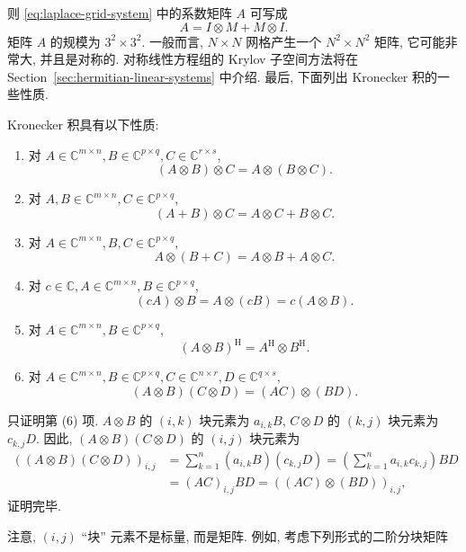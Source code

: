 {则 \eqref{eq:laplace-grid-system} 中的系数矩阵 $A$ 可写成}
\begin{equation}\label{eq:laplace-kronecker-sum}
A=I\otimes M+M\otimes I.
\end{equation}
{矩阵 $A$ 的规模为 $3^2\times3^2$. 一般而言, $N\times N$ 网格产生一个 $N^2\times N^2$ 矩阵, 它可能非常大, 并且是对称的. 对称线性方程组的 Krylov 子空间方法将在 Section\ \ref{sec:hermitian-linear-systems} 中介绍. 最后, 下面列出 Kronecker 积的一些性质.}
\begin{Theorem}\label{thm:kronecker-product-properties}
{Kronecker 积具有以下性质:}
\begin{enumerate}
\item {对 $A\in\mathbb{C}^{m\times n},B\in\mathbb{C}^{p\times q},C\in\mathbb{C}^{r\times s}$,}
\[(A\otimes B)\otimes C=A\otimes(B\otimes C).\]
\item {对 $A,B\in\mathbb{C}^{m\times n},C\in\mathbb{C}^{p\times q}$,}
\[(A+B)\otimes C=A\otimes C+B\otimes C.\]
\item {对 $A\in\mathbb{C}^{m\times n},B,C\in\mathbb{C}^{p\times q}$,}
\[A\otimes(B+C)=A\otimes B+A\otimes C.\]
\item {对 $c\in\mathbb{C},A\in\mathbb{C}^{m\times n},B\in\mathbb{C}^{p\times q}$,}
\[(cA)\otimes B=A\otimes(cB)=c(A\otimes B).\]
\item {对 $A\in\mathbb{C}^{m\times n},B\in\mathbb{C}^{p\times q}$,}
\[(A\otimes B)^{\mathrm H}=A^{\mathrm H}\otimes B^{\mathrm H}.\]
\item {对 $A\in\mathbb{C}^{m\times n},B\in\mathbb{C}^{p\times q},C\in\mathbb{C}^{n\times r},D\in\mathbb{C}^{q\times s}$,}
\[(A\otimes B)(C\otimes D)=(AC)\otimes(BD).\]
\end{enumerate}
\end{Theorem}
\begin{Proof}
{只证明第 (6) 项. $A\otimes B$ 的 $(i,k)$ 块元素为 $a_{i,k}B$, $C\otimes D$ 的 $(k,j)$ 块元素为 $c_{k,j}D$. 因此, $(A\otimes B)(C\otimes D)$ 的 $(i,j)$ 块元素为}
\[\begin{aligned}
((A\otimes B)(C\otimes D))_{i,j}&=\sum_{k=1}^n(a_{i,k}B)(c_{k,j}D)=\left(\sum_{k=1}^na_{i,k}c_{k,j}\right)BD\\
&=(AC)_{i,j}BD=((AC)\otimes(BD))_{i,j},
\end{aligned}\]
{证明完毕.}
\end{Proof}
{注意, $(i,j)$ ``块'' 元素不是标量, 而是矩阵. 例如, 考虑下列形式的二阶分块矩阵}

